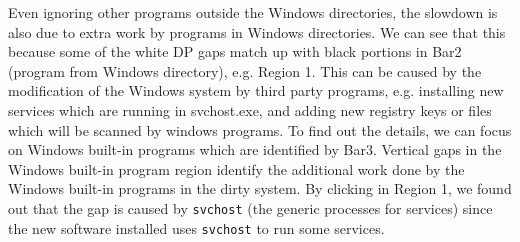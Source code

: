 Even ignoring other programs outside the Windows directories,
the slowdown is also due to extra work by programs in Windows
directories.
We can see that this because some of the white DP gaps match up with 
black portions in Bar2 (program from Windows directory), e.g. Region 1.
This can be caused by the modification of the Windows system
by third party programs,
e.g. installing new services which are running in svchost.exe, and adding new registry keys or files
which will be scanned by windows programs.
To find out the details, we can focus on Windows built-in programs which
are identified by Bar3.
Vertical gaps in the Windows built-in program region identify the additional work done
by the Windows built-in programs in the dirty system.
By clicking in Region 1, we found out that the gap is caused by
{\tt svchost} (the generic processes for services) since
the new software installed uses {\tt svchost} to run some services.
